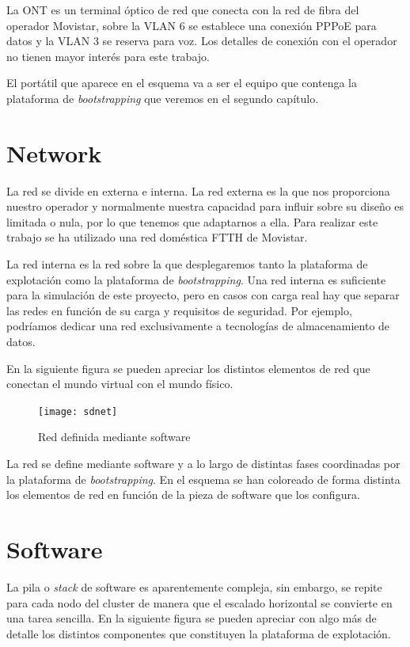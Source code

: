 \documentclass[a4paper,12pt,spanish,final]{epsc_tfc_pfc}
\begin{document}
La ONT es un terminal óptico de red que conecta con la red de fibra del operador Movistar, sobre la VLAN 6 se establece una conexión PPPoE para datos y la VLAN 3 se reserva para voz. Los detalles de conexión con el operador no tienen mayor interés para este trabajo.

El portátil que aparece en el esquema va a ser el equipo que contenga la plataforma de \emph{bootstrapping} que veremos en el segundo capítulo.

\clearpage

\section{Network}

La red se divide en externa e interna. La red externa es la que nos proporciona nuestro operador y normalmente nuestra capacidad para influir sobre su diseño es limitada o nula, por lo que tenemos que adaptarnos a ella. Para realizar este trabajo se ha utilizado una red doméstica FTTH de Movistar.

La red interna es la red sobre la que desplegaremos tanto la plataforma de explotación como la plataforma de \emph{bootstrapping}. Una red interna es suficiente para la simulación de este proyecto, pero en casos con carga real hay que separar las redes en función de su carga y requisitos de seguridad. Por ejemplo, podríamos dedicar una red exclusivamente a tecnologías de almacenamiento de datos.

En la siguiente figura se pueden apreciar los distintos elementos de red que conectan el mundo virtual con el mundo físico.

\begin{figure}[h]
  \centering
    \texttt{[image: sdnet]}
      \caption{Red definida mediante software}
\end{figure}

La red se define mediante software y a lo largo de distintas fases coordinadas por la plataforma de \emph{bootstrapping}. En el esquema se han coloreado de forma distinta los elementos de red en función de la pieza de software que los configura.

\section{Software}

La pila o \emph{stack} de software es aparentemente compleja, sin embargo, se repite para cada nodo del cluster de manera que el escalado horizontal se convierte en una tarea sencilla. En la siguiente figura se pueden apreciar con algo más de detalle los distintos componentes que constituyen la plataforma de explotación.
\end{document}
